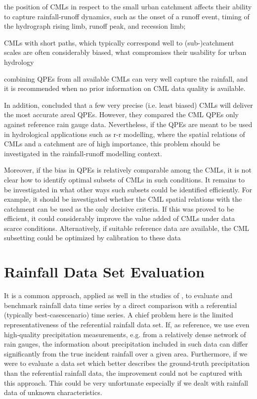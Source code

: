 \documentclass{ctuthesis}\usepackage[]{graphicx}\usepackage[]{color}
\begin{document}
the position of CMLs in respect to the small urban catchment affects their ability to capture rainfall-runoff dynamics, such as the onset of a runoff event, timing of the hydrograph rising limb, runoff peak, and recession limb;

CMLs with short paths, which typically correspond well to (sub-)catchment scales are often considerably biased, what compromises their usability for urban hydrology

combining QPEs from all available CMLs can very well capture the rainfall, and it is recommended when no prior information on CML data quality is available.

In addition, \cite{fenclCommercialMicrowaveLinks2015} concluded that a few very precise (i.e. least biased) CMLs will deliver the most accurate areal QPEs. However, they compared the CML QPEs only against reference rain gauge data. Nevertheless, if the QPEs are meant to be used in hydrological applications such as r-r modelling, where the spatial relations of CMLs and a catchment are of high importance, this problem should be investigated in the rainfall-runoff modelling context.

Moreover, if the bias in QPEs is relatively comparable among the CMLs, it is not clear how to identify optimal subsets of CMLs in such conditions. It remains to be investigated in what other ways such subsets could be identified efficiently. 
For example, it should be investigated whether the CML spatial relations with the catchment can be used as the only decisive criteria. If this was proved to be efficient, it could considerably improve the value added of CMLs under data scarce conditions.
Alternatively, if suitable reference data are available, the CML subsetting could be optimized by calibration to these data




\section{Rainfall Data Set Evaluation}

It is a common approach, applied as well in the studies of \cite{fenclCommercialMicrowaveLinks2015, fenclGaugeadjustedRainfallEstimates2017}, to evaluate and
benchmark rainfall data time series by a direct comparison with a referential (typically best‐casescenario)
time series. A chief problem here is the limited representativeness of the referential rainfall
data set. If, as reference, we use even high‐quality precipitation measurements, e.g. from a relatively
dense network of rain gauges, the information about precipitation included in such data can differ
significantly from the true incident rainfall over a given area. Furthermore, if we were to evaluate a
data set which better describes the ground‐truth precipitation than the referential rainfall data, the
improvement could not be captured with this approach. This could be very unfortunate especially if
we dealt with rainfall data of unknown characteristics.
\end{document}
